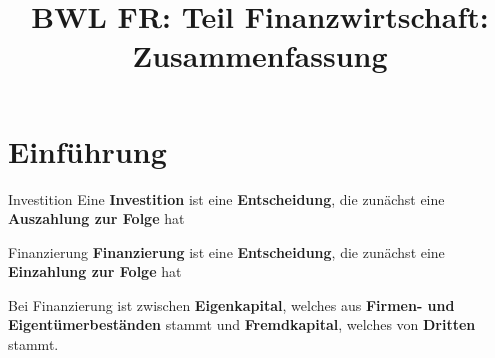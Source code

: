 
\newcommand{\ms}{$\mu$-$\sigma$}
\newcommand{\msd}{\ms-Diagramm}
\newcommand{\mbd}{$\mu$-$\beta$-Diagramm}
\title{BWL FR: Teil Finanzwirtschaft: Zusammenfassung}

	\maketitle
	\tableofcontents
	\newpage
	
\section{Einführung}

\begin{defi}{Investition}
	Eine \textbf{Investition} ist eine \textbf{Entscheidung}, die zunächst eine \textbf{Auszahlung zur Folge} hat
\end{defi}

\begin{defi}{Finanzierung}
	\textbf{Finanzierung} ist eine \textbf{Entscheidung}, die zunächst eine \textbf{Einzahlung zur Folge} hat
\end{defi}
\begin{ann}
	Bei Finanzierung ist zwischen \textbf{Eigenkapital}, welches aus \textbf{Firmen- und Eigentümerbeständen} stammt und \textbf{Fremdkapital}, welches von \textbf{Dritten} stammt.
\end{ann}

